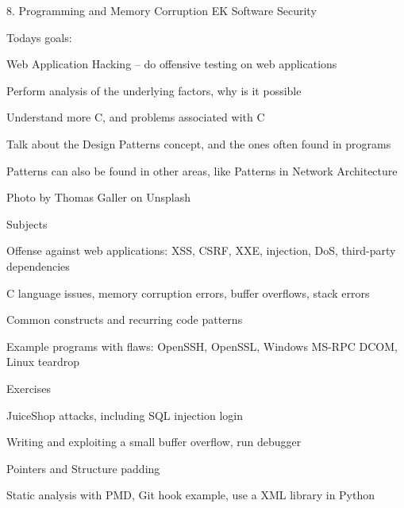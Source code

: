 \documentclass[Screen16to9,17pt]{foils}
\begin{document}
\mytitlepage
{8. Programming and Memory Corruption}
{EK  Software Security}



Todays goals:
\begin{list2}
\item Web Application Hacking -- do offensive testing on web applications
\item Perform analysis of the underlying factors, why is it possible
\item Understand more C, and problems associated with C
\item Talk about the Design Patterns concept, and the ones often found in programs
\item Patterns can also be found in other areas, like Patterns in Network Architecture
\end{list2}

Photo by Thomas Galler on Unsplash




\begin{list1}
\item Subjects
\begin{list2}
\item Offense against web applications: XSS, CSRF, XXE, injection, DoS, third-party dependencies
\item C language issues, memory corruption errors, buffer overflows, stack errors
\item Common constructs and recurring code patterns
\item Example programs with flaws: OpenSSH, OpenSSL, Windows MS-RPC DCOM, Linux teardrop
\end{list2}
\item Exercises
\begin{list2}
\item JuiceShop attacks, including SQL injection login
\item Writing and exploiting a small buffer overflow, run debugger
\item Pointers and Structure padding
\item Static analysis with PMD, Git hook example, use a XML library in Python
\end{list2}
\end{list1}

\end{document}
